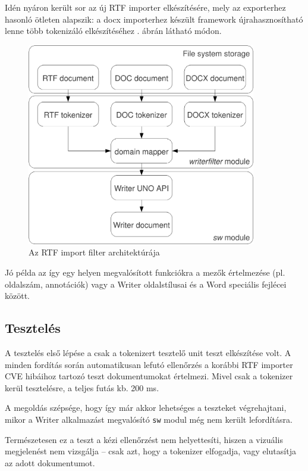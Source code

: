 \documentclass[a4paper]{report}
\begin{document}
Idén nyáron került sor az új RTF importer elkészítésére, mely az exporterhez
hasonló ötleten alapszik: a docx importerhez készült framework
újrahasznosítható lenne több tokenizáló elkészítéséhez .
ábrán látható módon.

\vspace{10mm}

\begin{figure}[h!]
\centering
\includegraphics[width=100mm,keepaspectratio]{overview-architecture.pdf}
\caption{Az RTF import filter architektúrája}
\label{fig:rtf-arch}
\end{figure}

Jó példa az így egy helyen megvalósított funkciókra a mezők értelmezése (pl.
oldalszám, annotációk) vagy a Writer oldalstílusai és a Word speciális fejlécei
között.

\subsection*{Tesztelés}

A tesztelés első lépése a csak a tokenizert tesztelő unit teszt elkészítése
volt. A minden fordítás során automatikusan lefutó ellenőrzés a korábbi RTF
importer CVE hibáihoz tartozó teszt dokumentumokat értelmezi. Mivel csak a
tokenizer kerül tesztelésre, a teljes futás kb. 200 ms.

A megoldás szépsége, hogy így már akkor lehetséges a teszteket végrehajtani,
mikor a Writer alkalmazást megvalósító \texttt{sw} modul még nem került
lefordításra.

Természetesen ez a teszt a kézi ellenőrzést nem helyettesíti, hiszen a vizuális
megjelenést nem vizsgálja -- csak azt, hogy a tokenizer elfogadja, vagy
elutasítja az adott dokumentumot.
\end{document}
